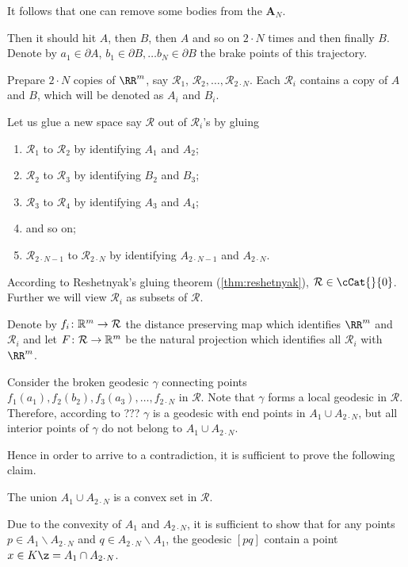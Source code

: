 It follows that one can remove some bodies from the $\bm{A}_N$.


Then it should hit $A$,
then $B$,
then $A$
and so on $2\cdot N$ times
and then finally $B$.
Denote by 
$a_1\in \partial A$, 
$b_1\in \partial B,
\dots
b_N\in \partial B$
the brake points of this trajectory.

Prepare $2\cdot N$ copies of $\RR^m$,
say $\mathcal{R}_1$, $\mathcal{R}_2,\dots,\mathcal{R}_{2\cdot N}$.
Each $\mathcal{R}_i$ contains a copy of $A$ and $B$, which will be denoted as $A_i$ and $B_i$.

Let us glue a new space say $\mathcal{R}$ out of $\mathcal{R}_i$'s
by gluing 
\begin{enumerate}
\item $\mathcal{R}_1$ to $\mathcal{R}_2$ by identifying $A_1$ and $A_2$;
\item $\mathcal{R}_2$ to $\mathcal{R}_3$  by identifying $B_2$ and $B_3$;
\item $\mathcal{R}_3$ to $\mathcal{R}_4$  by identifying $A_3$ and $A_4$;
\item and so on;
\item $\mathcal{R}_{2\cdot N-1}$ to $\mathcal{R}_{2\cdot N}$ by identifying $A_{2\cdot N-1}$ and $A_{2\cdot N}$.
\end{enumerate}
According to Reshetnyak's gluing theorem (\ref{thm:reshetnyak}), $\mathcal{R}\in\cCat{}{0}$.
Further we will view $\mathcal{R}_i$ as subsets of $\mathcal{R}$.

Denote by $f_i\:\RR^m\to\mathcal{R}$ the distance preserving map which identifies $\RR^m$ and $\mathcal{R}_i$
and let $F\:\mathcal{R} \to \RR^m$ be the natural projection which identifies all $\mathcal{R}_i$ with $\RR^m$.

Consider the broken geodesic $\gamma$ connecting points $f_1(a_1),f_2(b_2),f_3(a_3),\dots,f_{2\cdot N}$ in $\mathcal{R}$.
Note that $\gamma$ forms a local geodesic in $\mathcal{R}$.
Therefore, according to ??? $\gamma$ is a geodesic with end points in $A_1\cup A_{2\cdot N}$,
but all interior points of $\gamma$ do not belong to $A_1\cup A_{2\cdot N}$.

Hence in order to arrive to a contradiction, 
it is sufficient to prove the following claim.
 
\begin{clm}{}
The union $A_1\cup A_{2\cdot N}$ is a convex set in $\mathcal{R}$.
\end{clm}

Due to the convexity of $A_1$ and $A_{2\cdot N}$,
it is sufficient to show that for any points $p\in A_1\backslash A_{2\cdot N}$ and $q\in A_{2\cdot N}\backslash A_1$,
the geodesic $[pq]$ contain a point $x\in K\z=A_1\cap A_{2\cdot N}$.

